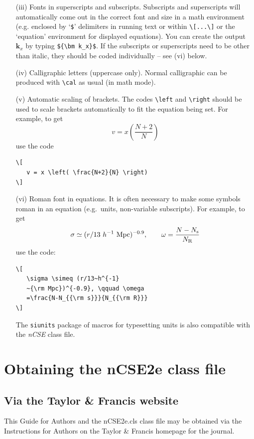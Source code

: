 \documentclass{nCSE2e}
\begin{document}
\begin{enumerate}
\item[(iii)] Fonts in superscripts and subscripts. Subscripts and superscripts will automatically come  out in the correct font
and size in a math environment (e.g. enclosed by `\verb"$"'
delimiters in running text or within \verb"\[...\]" or the
`equation' environment for displayed equations). You can create
the output ${\bm k_x}$ by typing \verb"${\bm k_x}$". If the
subscripts or superscripts need to be other than italic, they
should be coded individually -- see (vi) below.

\item[(iv)] Calligraphic letters (uppercase only).
%
Normal calligraphic can be produced with \verb"\cal" as usual (in
math mode).

\item[(v)] Automatic scaling of brackets. The codes \verb"\left" and
\verb"\right" should  be used to scale brackets automatically to
fit the equation being set. For example, to get
\[
   v = x \left( \frac{N+2}{N} \right)
\]
use the code
%
\begin{verbatim}
\[
   v = x \left( \frac{N+2}{N} \right)
\]
\end{verbatim}

\item[(vi)] Roman font in equations. It is often necessary to make some
symbols roman in an equation (e.g.\ units, non-variable
subscripts). For example, to get
\[
   \sigma \simeq (r/13~h^{-1}~{\rm Mpc})^{-0.9},
   \qquad \omega = \frac{N-N_{\rm s}}{N_{\rm R}}
\]
\noindent use the code:
%
\begin{verbatim}
\[
   \sigma \simeq (r/13~h^{-1}
   ~{\rm Mpc})^{-0.9}, \qquad \omega
   =\frac{N-N_{{\rm s}}}{N_{{\rm R}}}
\]
\end{verbatim}
The {\tt siunits} package of macros for typesetting units is also compatible with the {\it nCSE} class file.
\end{enumerate}


\section{Obtaining the nCSE2e class file}\label{FTP}

\subsection{Via the Taylor \& Francis website}

This Guide for Authors and the nCSE2e.cls class file may be obtained via the Instructions for Authors
on the Taylor \& Francis homepage for the journal.
\end{document}
